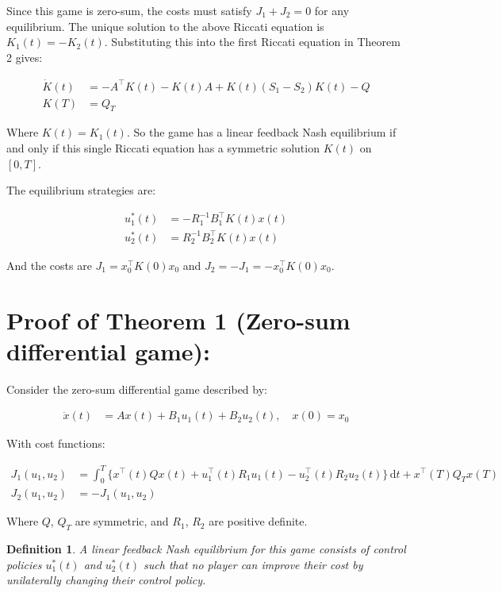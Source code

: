 \documentclass[3p]{elsarticle}
\newtheorem{definition}{Definition}
\begin{document}
Since this game is zero-sum, the costs must satisfy $J_1 + J_2 = 0$ for any equilibrium. The unique solution to the above Riccati equation is $K_1(t) = -K_2(t)$. Substituting this into the first Riccati equation in Theorem 2 gives:

\begin{align*} 
\dot{K}(t) &= -A^\top K(t) - K(t)A + K(t)(S_1-S_2)K(t) - Q \\
K(T) &= Q_T
\end{align*}

Where $K(t) = K_1(t)$. So the game has a linear feedback Nash equilibrium if and only if this single Riccati equation has a symmetric solution $K(t)$ on $[0,T]$. 

The equilibrium strategies are:

\begin{align*}
u_1^*(t) &= -R_1^{-1}B_1^\top K(t) x(t) \\ 
u_2^*(t) &= R_2^{-1}B_2^\top K(t) x(t)
\end{align*}

And the costs are $J_1 = x_0^\top K(0) x_0$ and $J_2 = -J_1 = -x_0^\top K(0) x_0$.




\section*{Proof of Theorem 1 (Zero-sum differential game):}

Consider the zero-sum differential game described by:

\begin{align*}
\dot{x}(t) &= Ax(t) + B_1u_1(t) + B_2u_2(t), \quad x(0)=x_0
\end{align*}

With cost functions:

\begin{align*}
J_1(u_1,u_2) &= \int_0^T \{x^\top (t)Qx(t) + u_1^\top(t) R_1u_1(t) - u_2^\top(t)R_2u_2(t)\}\,\mathrm{d}t + x^\top(T)Q_Tx(T) \\
J_2(u_1,u_2) &= -J_1(u_1,u_2)
\end{align*}

Where $Q$, $Q_T$ are symmetric, and $R_1$, $R_2$ are positive definite.

\begin{definition}
A linear feedback Nash equilibrium for this game consists of control policies $u_1^*(t)$ and $u_2^*(t)$ such that no player can improve their cost by unilaterally changing their control policy.
\end{definition}
\end{document}
